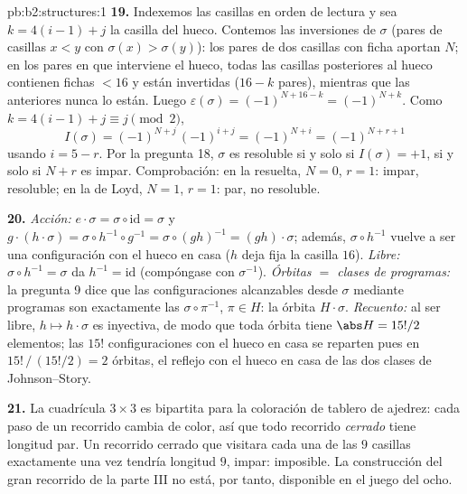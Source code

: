 \begin{solution}{pb:b2:structures:1}
\textbf{19.} Indexemos las casillas en orden de lectura y sea $k =
4(i - 1) + j$ la casilla del hueco. Contemos las inversiones de
$\sigma$ (pares de casillas $x < y$ con $\sigma(x) > \sigma(y)$):
los pares de dos casillas con ficha aportan $N$; en los pares en
que interviene el hueco, todas las casillas posteriores al hueco
contienen fichas $< 16$ y están invertidas ($16 - k$ pares),
mientras que las anteriores nunca lo están. Luego
$\varepsilon(\sigma) = (-1)^{N + 16 - k} = (-1)^{N + k}$. Como $k =
4(i-1) + j \equiv j \pmod 2$,
\[
I(\sigma) = (-1)^{N + j}\,(-1)^{i + j} = (-1)^{N + i}
= (-1)^{N + r + 1}
\]
usando $i = 5 - r$. Por la pregunta 18, $\sigma$ es resoluble si y
solo si $I(\sigma) = +1$, si y solo si $N + r$ es impar.
Comprobación: en la resuelta, $N = 0$, $r = 1$: impar, resoluble;
en la de Loyd, $N = 1$, $r = 1$: par, no resoluble.

\textbf{20.} \emph{Acción:} $e \cdot \sigma = \sigma \circ
\mathrm{id} = \sigma$ y $g \cdot (h \cdot \sigma) = \sigma \circ
h^{-1} \circ g^{-1} = \sigma \circ (gh)^{-1} = (gh) \cdot \sigma$;
además, $\sigma \circ h^{-1}$ vuelve a ser una configuración con el
hueco en casa ($h$ deja fija la casilla $16$). \emph{Libre:}
$\sigma \circ h^{-1} = \sigma$ da $h^{-1} = \mathrm{id}$
(compóngase con $\sigma^{-1}$). \emph{Órbitas $=$ clases de
programas:} la pregunta 9 dice que las configuraciones alcanzables
desde $\sigma$ mediante programas son exactamente las $\sigma \circ
\pi^{-1}$, $\pi \in H$: la órbita $H \cdot \sigma$.
\emph{Recuento:} al ser libre, $h \mapsto h \cdot \sigma$ es
inyectiva, de modo que toda órbita tiene $\abs H = 15!/2$
elementos; las $15!$ configuraciones con el hueco en casa se
reparten pues en $15!\,/\,(15!/2) = 2$ órbitas, el reflejo con el
hueco en casa de las dos clases de Johnson--Story.

\textbf{21.} La cuadrícula $3 \times 3$ es bipartita para la
coloración de tablero de ajedrez: cada paso de un recorrido cambia
de color, así que todo recorrido \emph{cerrado} tiene longitud par.
Un recorrido cerrado que visitara cada una de las $9$ casillas
exactamente una vez tendría longitud $9$, impar: imposible. La
construcción del gran recorrido de la parte III no está, por tanto,
disponible en el juego del ocho.


\end{solution}
